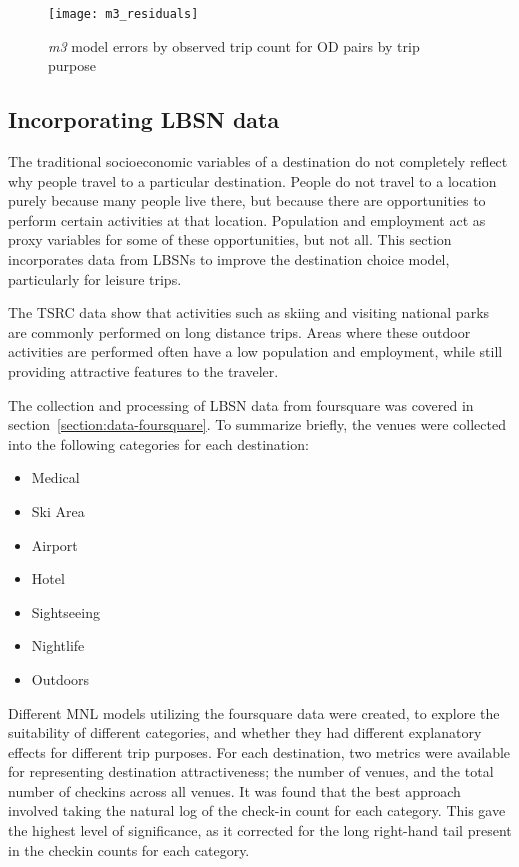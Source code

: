 \begin{figure}[H]
\centering
\texttt{[image: m3\_residuals]}
\caption{\textit{m3} model errors by observed trip count for OD pairs by trip purpose}
\label{fig:m3_residuals}
\end{figure}


\subsection{Incorporating LBSN data}

The traditional socioeconomic variables of a destination do not completely reflect why people travel to a particular destination. People do not travel to a location purely because many people live there, but because there are opportunities to perform certain activities at that location. Population and employment act as proxy variables for some of these opportunities, but not all. This section incorporates data from LBSNs to improve the destination choice model, particularly for leisure trips.  

The TSRC data show that activities such as skiing and visiting national parks are commonly performed on long distance trips. Areas where these outdoor activities are performed often have a low population and employment, while still providing attractive features to the traveler.

The collection and processing of LBSN data from foursquare was covered in section~\ref{section:data-foursquare}. To summarize briefly, the venues were collected into the following categories for each destination:
\begin{multicols}{2}
\raggedcolumns
\begin{itemize}
\item Medical
\item Ski Area
\item Airport
\item Hotel
\item Sightseeing
\item Nightlife
\item Outdoors
\end{itemize}
\end{multicols}


Different MNL models utilizing the foursquare data were created, to explore the suitability of different categories, and whether they had different explanatory effects for different trip purposes. For each destination, two metrics were available for representing destination attractiveness; the number of venues, and the total number of checkins across all venues.
It was found that the best approach involved taking the natural log of the check-in count for each category. This gave the highest level of significance, as it corrected for the long right-hand tail present in the checkin counts for each category.

